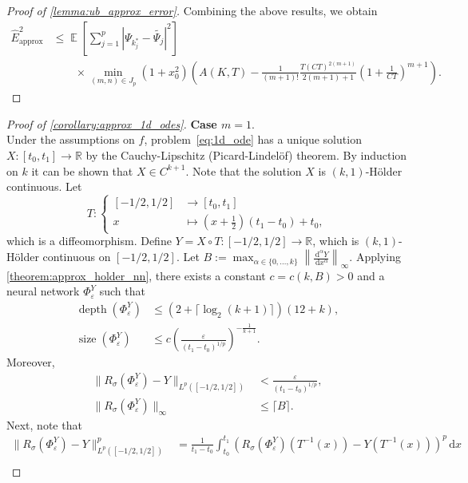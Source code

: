 \documentclass[12pt]{article}
\theoremstyle{remark}
\theoremstyle{plain}
\numberwithin{equation}{section}
\newcommand{\dd}{\ensuremath{\,\mathrm d}}
\DeclareMathOperator{\E}{\mathbb E}
\newcommand{\R}{\mathbb{R}}
\DeclareMathOperator{\Size}{size}
\DeclareMathOperator{\Depth}{depth}
\begin{document}
\begin{proof}[Proof of \cref{lemma:ub_approx_error}]
    Combining the above results, we obtain
    \begin{align*}
        \hat E_\text{approx}^2 &\leq \E\left[\sum_{j=1}^p |\Psi_{k_j^*}-\widetilde{\Psi_j}|^2\right]\\ &\qquad\times \min_{(m,n) \in J_p}(1+x_0^2)\left(A(K,T) - \frac{1}{(m+1)!}\frac{T(CT)^{2(m+1)}}{2(m+1)+1}\left(1+\frac{1}{CT}\right)^{m+1}\right).
    \end{align*}
\end{proof}

\begin{proof}[Proof of \cref{corollary:approx_1d_odes}]
    \textbf{Case $m=1$}.\\
    Under the assumptions on $f$, problem~\cref{eq:1d_ode} has a unique solution $X : [t_0, t_1] \to \R$ by the Cauchy-Lipschitz (Picard-Lindel\"of) theorem.
    By induction on $k$ it can be shown that $X \in C^{k+1}$.
    Note that the solution $X$ is $(k,1)$-H\"older continuous.
    Let 
    \begin{equation*}
        T : \left\{
        \begin{array}{rl}
            [-1/2,1/2] & \longrightarrow [t_0,t_1] \\
            x & \longmapsto (x+\frac 1 2)(t_1-t_0) + t_0,
        \end{array}
        \right.
    \end{equation*}
    which is a diffeomorphism. Define $Y = X \circ T : [-1/2,1/2] \to \R$, which is $(k,1)$-H\"older continuous on $[-1/2,1/2]$.
    Let $B := \max_{\alpha \in \{0,\dots,k\}} \left\|\frac{\dd^\alpha Y}{\dd x^\alpha}\right\|_\infty$.
    Applying \cref{theorem:approx_holder_nn}, there exists a constant $c = c(k, B) > 0$ and a neural network $\Phi_\varepsilon^Y$ such that
    \begin{align*}
        \Depth(\Phi_\varepsilon^Y) &\leq (2 + \lceil \log_2(k + 1)\rceil)(12+k),\\
        \Size(\Phi_\varepsilon^Y) &\leq c\left(\frac{\varepsilon}{(t_1-t_0)^{1/p}}\right)^{-\frac{1}{k+1}}.
    \end{align*}
    Moreover,
    \begin{align*}
        \|R_\sigma(\Phi_\varepsilon^Y) - Y\|_{L^p([-1/2,1/2])} &< \frac{\varepsilon}{(t_1-t_0)^{1/p}},\\
        \|R_\sigma(\Phi_\varepsilon^Y)\|_\infty &\leq \lceil B \rceil.
    \end{align*}
    Next, note that
    \begin{align*}
        \|R_\sigma(\Phi_\varepsilon^Y) - Y\|_{L^p([-1/2,1/2])}^p &= \frac{1}{t_1-t_0}\int_{t_0}^{t_1} (R_\sigma(\Phi_\varepsilon^Y)(T^{-1}(x)) - Y(T^{-1}(x)))^p \dd x\\

\end{align*}
\end{proof}
\end{document}
